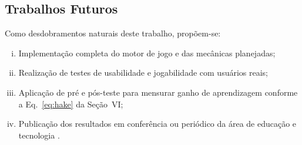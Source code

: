 \subsection{Trabalhos Futuros}

Como desdobramentos naturais deste trabalho, propõem-se:

\begin{enumerate}[i.]
    \item Implementação completa do motor de jogo e das mecânicas planejadas;
    \item Realização de testes de usabilidade e jogabilidade com usuários reais;
    \item Aplicação de pré e pós-teste para mensurar ganho de aprendizagem
          conforme a Eq.~\eqref{eq:hake} da Seção~VI;
    \item Publicação dos resultados em conferência ou periódico da área de
          educação e tecnologia \cite{mayer2019serious}.
\end{enumerate}

